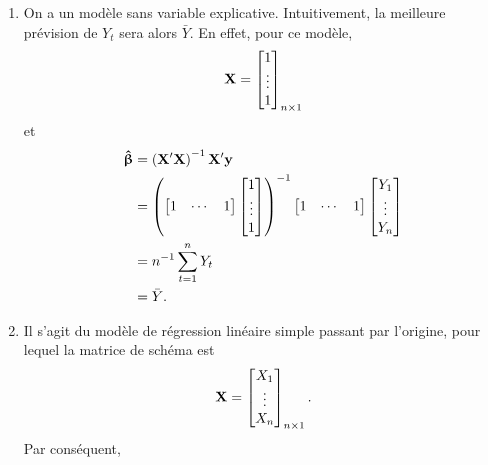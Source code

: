\begin{solution}{3.2}
    \begin{enumerate}
    \item On a un modèle sans variable explicative. Intuitivement, la
      meilleure prévision de $Y_t$ sera alors $\bar{Y}$. En effet,
      pour ce modèle,
      \begin{displaymath}
        \mathbf{X} =
        \begin{bmatrix}
          1 \\ \vdots \\ 1
        \end{bmatrix}_{n \times 1}
      \end{displaymath}
      et
      \begin{align*}
        \boldsymbol{\hat{\upbeta}}
        &=\left(\mathbf{X}^\prime \mathbf{X} \right)^{-1} \mathbf{X}^\prime
        \mathbf{y} \\
        &=
        \left(
          \begin{bmatrix}
            1 & \cdots & 1
          \end{bmatrix}
          \begin{bmatrix}
            1 \\ \vdots \\ 1
          \end{bmatrix}
        \right)^{-1}
        \begin{bmatrix}
          1 & \cdots & 1
        \end{bmatrix}
        \begin{bmatrix}
          Y_1 \\ \vdots \\ Y_n
        \end{bmatrix}\\
        &= n^{-1} \sum_{t=1}^n Y_t \\
        &= \bar{Y}.
      \end{align*}
    \item Il s'agit du modèle de régression linéaire simple passant
      par l'origine, pour lequel la matrice de schéma est
      \begin{displaymath}
        \mathbf{X} =
        \begin{bmatrix}
          X_1 \\ \vdots \\ X_n
        \end{bmatrix}_{n \times 1}.
      \end{displaymath}
      Par conséquent,
      \begin{align*}

\end{align*}
\end{enumerate}
\end{solution}
